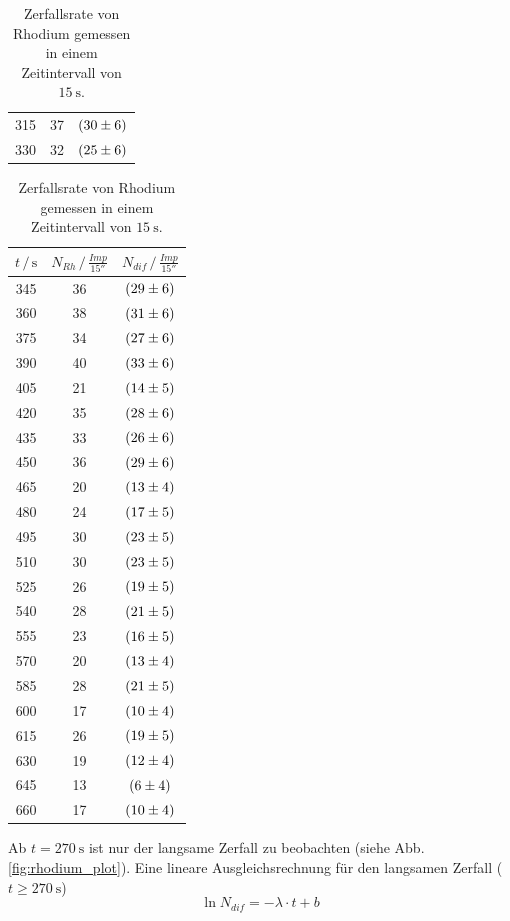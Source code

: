 \begin{table}
\begin{tabular}{ccc|}
    315 & 37  & $\SI{30+-6}{}$ \\
    330 & 32  & $\SI{25+-6}{}$ \\
    \bottomrule
    \end{tabular}
    \begin{tabular}{|ccc}
    \toprule
    $t \,/\, \si{\second}$ & $N_{Rh} \,/\, \si{\frac{Imp}{15 \second}}$ & $N_{dif} \,/\, \si{\frac{Imp}{15 \second}}$ \\
    \midrule
    345 & 36 & $\SI{29+-6}{}$ \\
    360 & 38 & $\SI{31+-6}{}$ \\
    375 & 34 & $\SI{27+-6}{}$ \\
    390 & 40 & $\SI{33+-6}{}$ \\
    405 & 21 & $\SI{14+-5}{}$ \\
    420 & 35 & $\SI{28+-6}{}$ \\
    435 & 33 & $\SI{26+-6}{}$ \\
    450 & 36 & $\SI{29+-6}{}$ \\
    465 & 20 & $\SI{13+-4}{}$ \\
    480 & 24 & $\SI{17+-5}{}$ \\
    495 & 30 & $\SI{23+-5}{}$ \\
    510 & 30 & $\SI{23+-5}{}$ \\
    525 & 26 & $\SI{19+-5}{}$ \\
    540 & 28 & $\SI{21+-5}{}$ \\
    555 & 23 & $\SI{16+-5}{}$ \\
    570 & 20 & $\SI{13+-4}{}$ \\
    585 & 28 & $\SI{21+-5}{}$ \\
    600 & 17 & $\SI{10+-4}{}$ \\
    615 & 26 & $\SI{19+-5}{}$ \\
    630 & 19 & $\SI{12+-4}{}$ \\
    645 & 13 & $\SI{6+-4}{}$ \\
    660 & 17 & $\SI{10+-4}{}$ \\
    \bottomrule
    \end{tabular}
    \caption{Zerfallsrate von Rhodium gemessen in einem Zeitintervall von $\SI{15}{\second}$.}
    \label{tab:rhodium}
\end{table}
Ab $t = \SI{270}{\second}$ ist nur der langsame Zerfall zu beobachten (siehe Abb. \ref{fig:rhodium_plot}).
Eine lineare Ausgleichsrechnung für den langsamen Zerfall ($t \geq \SI{270}{\second}$)
\begin{equation}
    \ln N_{dif} = -\lambda \cdot t + b
    \label{eqn:ausgleichsgerade}
\end{equation}
